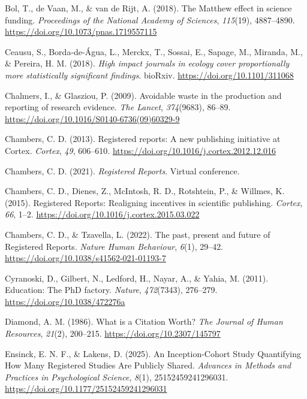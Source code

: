 \documentclass[
  british,
  a4paper,
  ,man,mask,floatsintext]{apa6}
\newlength{\cslhangindent}
\newenvironment{CSLReferences}[2] %
 {\begin{list}{}{%
  \setlength{\itemindent}{0pt}
  \setlength{\leftmargin}{0pt}
  \setlength{\parsep}{0pt}
  \ifodd #1
   \setlength{\leftmargin}{\cslhangindent}
   \setlength{\itemindent}{-1\cslhangindent}
  \fi
  \setlength{\itemsep}{#2\baselineskip}}}
 {\end{list}}
\begin{document}
\begin{CSLReferences}{1}{0}
Bol, T., de Vaan, M., \& van de Rijt, A. (2018). The {Matthew} effect in science funding. \emph{Proceedings of the National Academy of Sciences}, \emph{115}(19), 4887--4890. \url{https://doi.org/10.1073/pnas.1719557115}

Ceausu, S., Borda-de-Água, L., Merckx, T., Sossai, E., Sapage, M., Miranda, M., \& Pereira, H. M. (2018). \emph{High impact journals in ecology cover proportionally more statistically significant findings}. bioRxiv. \url{https://doi.org/10.1101/311068}

Chalmers, I., \& Glasziou, P. (2009). Avoidable waste in the production and reporting of research evidence. \emph{The Lancet}, \emph{374}(9683), 86--89. \url{https://doi.org/10.1016/S0140-6736(09)60329-9}

Chambers, C. D. (2013). Registered reports: {A} new publishing initiative at {Cortex}. \emph{Cortex}, \emph{49}, 606--610. \url{https://doi.org/10.1016/j.cortex.2012.12.016}

Chambers, C. D. (2021). \emph{Registered {Reports}}. Virtual conference.

Chambers, C. D., Dienes, Z., McIntosh, R. D., Rotshtein, P., \& Willmes, K. (2015). Registered {Reports}: {Realigning} incentives in scientific publishing. \emph{Cortex}, \emph{66}, 1--2. \url{https://doi.org/10.1016/j.cortex.2015.03.022}

Chambers, C. D., \& Tzavella, L. (2022). The past, present and future of {Registered Reports}. \emph{Nature Human Behaviour}, \emph{6}(1), 29--42. \url{https://doi.org/10.1038/s41562-021-01193-7}

Cyranoski, D., Gilbert, N., Ledford, H., Nayar, A., \& Yahia, M. (2011). Education: {The PhD} factory. \emph{Nature}, \emph{472}(7343), 276--279. \url{https://doi.org/10.1038/472276a}

Diamond, A. M. (1986). What is a {Citation Worth}? \emph{The Journal of Human Resources}, \emph{21}(2), 200--215. \url{https://doi.org/10.2307/145797}

Ensinck, E. N. F., \& Lakens, D. (2025). An {Inception-Cohort Study Quantifying How Many Registered Studies Are Publicly Shared}. \emph{Advances in Methods and Practices in Psychological Science}, \emph{8}(1), 25152459241296031. \url{https://doi.org/10.1177/25152459241296031}


\end{CSLReferences}
\end{document}
